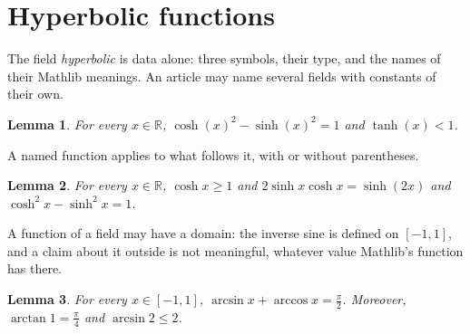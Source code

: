 \documentclass{article}
\newtheorem{lemma}{Lemma}
\begin{document}
\section{Hyperbolic functions}

The field \emph{hyperbolic} is data alone: three symbols, their type, and the names of their Mathlib meanings.
An article may name several fields with constants of their own.

\begin{lemma}\label{hyperbolic}
For every $x\in\mathbb{R}$, $\cosh(x)^2-\sinh(x)^2=1$ and $\tanh(x)<1$.
\end{lemma}

A named function applies to what follows it, with or without parentheses.

\begin{lemma}\label{hyperbolic-juxtaposed}
For every $x\in\mathbb{R}$, $\cosh x\ge1$ and $2\sinh x\cosh x=\sinh(2x)$ and $\cosh^2 x-\sinh^2 x=1$.
\end{lemma}

A function of a field may have a domain: the inverse sine is defined on $[-1,1]$, and a claim about it outside is not meaningful, whatever value Mathlib's function has there.

\begin{lemma}\label{inverse-sine}
For every $x\in[-1,1]$, $\arcsin x+\arccos x=\frac{\pi}{2}$.
Moreover, $\arctan 1=\frac{\pi}{4}$ and $\arcsin 2\le2$.
\end{lemma}
\end{document}
